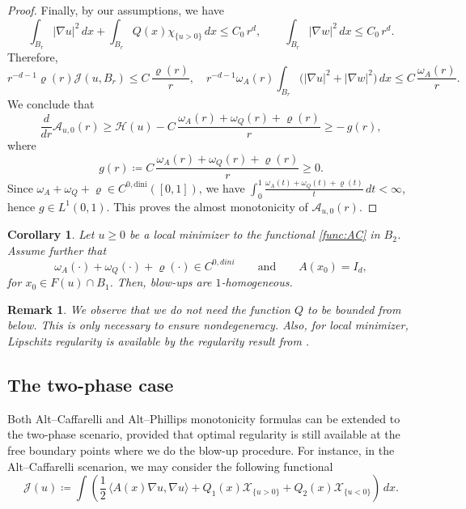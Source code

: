 \documentclass[reqno,11pt]{amsart}
\newtheorem{corollary}{Corollary}[section]
\newtheorem{remark}{Remark}[section]
\newcommand{\1}{\mathds{1}}  %
\numberwithin{equation}{section}
\begin{document}
\begin{proof}
Finally, by our assumptions, we have
\[
\int_{B_r}|\nabla u|^2\,dx + \int_{B_r}Q(x)\chi_{\{u>0\}}\,dx \le C_0\,r^{d},
\qquad
\int_{B_r}|\nabla w|^2\,dx \le C_0\,r^{d}.
\]
Therefore,
\[
r^{-d-1}\varrho(r)\mathcal J(u,B_r)\le C\,\frac{\varrho(r)}{r},
\quad
r^{-d-1}\omega_A(r)\!\int_{B_r}\big(|\nabla u|^2+|\nabla w|^2\big)\,dx \le C\,\frac{\omega_A(r)}{r}.
\]
We conclude that
\[
\frac{d}{dr}\mathcal A_{u,0}(r)
\ge \mathcal H(u) - C\,\frac{\omega_A(r)+\omega_Q(r)+\varrho(r)}{r}
\ge -\,g(r),
\]
where
\[
g(r)\coloneqq C\,\frac{\omega_A(r)+\omega_Q(r)+\varrho(r)}{r}\ge 0.
\]
Since $\omega_A+\omega_Q+\varrho\in C^{0,\mathrm{dini}}([0,1])$, we have $\int_0^1 \frac{\omega_A(t)+\omega_Q(t)+\varrho(t)}{t}\,dt<\infty$, hence $g\in L^1(0,1)$. This proves the almost monotonicity of $\mathcal A_{u,0}(r)$.
\end{proof}

\begin{corollary}
Let $u \geq 0$ be a local minimizer to the functional \eqref{func:AC} in $B_2$. Assume further that
\[
	\omega_A(\cdot) + \omega_Q(\cdot) + \varrho(\cdot) \in C^{0,dini} \qquad \text{and} \qquad A(x_0) = I_d,
\]
for $x_0 \in F(u)\cap B_1$. Then, blow-ups are $1$-homogeneous.
\end{corollary}

\begin{remark}
We observe that we do not need the function $Q$ to be bounded from below. This is only necessary to ensure nondegeneracy. Also, for local minimizer, Lipschitz regularity is available by the regularity result from \cite{DSS1}.
\end{remark}

\subsection{The two-phase case}

Both Alt--Caffarelli and Alt--Phillips monotonicity formulas can be extended to the two-phase scenario, provided that optimal regularity is still available at the free boundary points where we do the blow-up procedure. For instance, in the Alt--Caffarelli scenarion, we may consider the following functional
\begin{equation}\label{two-phase functional AC}
	\mathcal J(u) \coloneqq \int \left( \frac{1}{2} \, \langle A(x)\nabla u, \nabla u \rangle + Q_1(x)\mathcal{X}_{\{u>0\}} + Q_2(x)\mathcal{X}_{\{u<0\}}\right)\,dx.
\end{equation}
\end{document}
